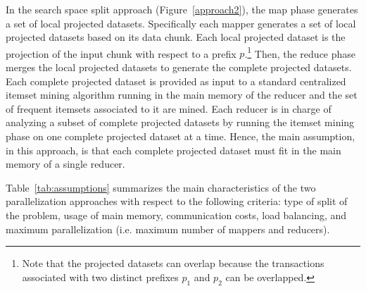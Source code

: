 \documentclass[preprint,review,12pt]{elsarticle}
\begin{document}
In the search space split approach (Figure~\ref{approach2}), the map phase generates a set of local projected datasets. Specifically each mapper generates a set of local projected datasets based on its data chunk. Each local projected dataset is the projection of the input chunk with respect to a prefix $p$.\footnote{Note that the projected datasets can overlap because the transactions associated with two distinct prefixes $p_1$ and $p_2$ can be overlapped.} Then, the reduce phase merges the local projected datasets to generate the complete projected datasets. Each complete projected dataset is provided as input to a standard centralized itemset mining algorithm running in the main memory of the reducer and the set of frequent itemsets associated to it are mined.
Each reducer is in charge of analyzing a subset of complete projected datasets by running the itemset mining phase on one complete projected dataset at a time.   
Hence, the main assumption, in this approach, is that each complete projected dataset must fit in the main memory of a single reducer. 

Table~\ref{tab:assumptions} summarizes the main characteristics of the two parallelization approaches with respect to the following criteria: 
type of split of the problem, 
usage of main memory, 
communication costs, 
load balancing, 
and maximum parallelization (i.e. maximum number of mappers and reducers).


\end{document}

